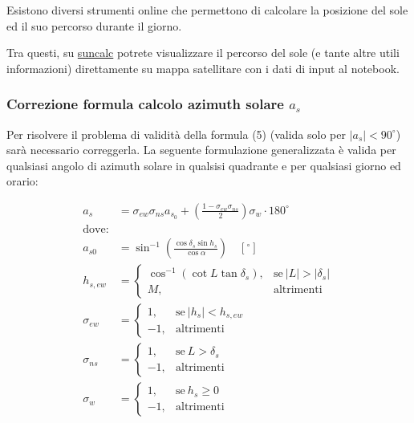 \documentclass[11pt]{article}
\begin{document}
    Esistono diversi strumenti online che permettono di calcolare la
posizione del sole ed il suo percorso durante il giorno.
 
            
    
    Tra questi, su
\href{https://www.suncalc.org/\#/45,7.68,18/2022.03.30/13:00/0/1}{suncalc}
potrete visualizzare il percorso del sole (e tante altre utili
informazioni) direttamente su mappa satellitare con i dati di input al
notebook.

    

    \hypertarget{correzione-formula-calcolo-azimuth-solare-a_s}{%
\subsubsection{\texorpdfstring{Correzione formula calcolo azimuth solare
\(a_s\)}{Correzione formula calcolo azimuth solare a\_s}}\label{correzione-formula-calcolo-azimuth-solare-a_s}}

Per risolvere il problema di validità della formula (5) (valida solo per
\(|a_s|<90^{{\circ}}\)) sarà necessario correggerla. La seguente
formulazione generalizzata è valida per qualsiasi angolo di azimuth
solare in qualsisi quadrante e per qualsiasi giorno ed orario:

    \[\begin{align*}
a_s &= \sigma_{ew} \sigma_{ns} a_{s_0} +\left (  \frac{1-\sigma_{ew}\sigma_{ns}}{2}\right ) \sigma_w\cdot 180^{{\circ}}\\
\text{dove:} \\
a_{s0} &=\sin^{-1}\left ( \frac{\cos \delta_s \sin h_s }{\cos \alpha} \right ) \quad [^{{\circ}}] \\
h_{s,ew}  &=  \begin{cases} \cos^{-1}\left(\cot L \tan \delta_s \right), & \text{se} \ |L|>|\delta_s| \\ M, & \text{altrimenti} \  \end{cases}\\
\sigma_{ew} &= \begin{cases} 1, & \text{se} \ |h_s|< h_{s,ew} \\ -1, & \text{altrimenti} \end{cases} \\
\sigma_{ns}  &= \begin{cases} 1, & \text{se} \ L>\delta_s \\ -1, & \text{altrimenti} \end{cases} \\
\sigma_w &= \begin{cases} 1, & \text{se} \ h_s\geq 0 \\ -1, & \text{altrimenti} \end{cases} \\
\end{align*}\]
\end{document}
